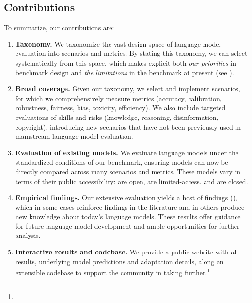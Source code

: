 \hypertarget{contributions}{\subsection{Contributions}}
\label{sec:contributions}
To summarize, our contributions are:
\begin{enumerate}
  \item \textbf{Taxonomy.}
  We taxonomize the vast design space of language model evaluation into scenarios and metrics.
  By stating this taxonomy, we can select systematically from this space, which makes explicit both \textit{our priorities} in benchmark design and \textit{the limitations} in the benchmark at present (see ).
  \item 
  \textbf{Broad coverage.}
  Given our taxonomy, we select and implement \numcorescenarios \core scenarios, for which we comprehensively measure \nummetriccategories metrics (accuracy, calibration, robustness, fairness, bias, toxicity, efficiency).
  We also include \numcomponents targeted evaluations of skills and risks (\eg knowledge, reasoning, disinformation, copyright), introducing \numnewscenarios new scenarios that have not been previously used in mainstream language model evaluation.
  \item \textbf{Evaluation of existing models.}
  We evaluate \nummodels language models under the standardized conditions of our benchmark, ensuring models can now be directly compared across many scenarios and metrics.
  These models vary in terms of their public accessibility: \numpublicmodels are open, \numlimitedmodels are limited-access, and \numclosedmodels are closed.
 \item \textbf{Empirical findings.}
 Our extensive evaluation yields a host of findings (), which in some cases reinforce findings in the literature and in others produce new knowledge about today's language models.
 These results offer guidance for future language model development and ample opportunities for further analysis. 
  \item \textbf{Interactive results and codebase.}
  We provide a public website with all results, underlying model predictions and adaptation details, along an extensible codebase to support the community in taking \benchmarkname further.\footnote{\benchmarkUrl{}}
\end{enumerate}

